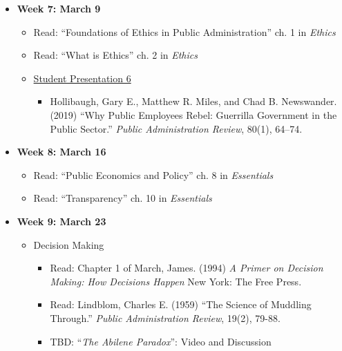 \documentclass[11pt]{article}
\begin{document}
\begin{itemize}
	\item[] \textbf{Week 7: March 9} 
		\begin{itemize}
				\item Read: ``Foundations of Ethics in Public Administration'' ch. 1 in \emph{Ethics}
				\item Read: ``What is Ethics'' ch. 2 in \emph{Ethics}
				\item \underline{Student Presentation 6}
					\begin{itemize}
						\item Hollibaugh, Gary E., Matthew R. Miles, and Chad B. Newswander. (2019) ``Why Public Employees Rebel: Guerrilla Government in the Public Sector.'' \emph{Public Administration Review}, 80(1), 64--74.
					\end{itemize}
		\end{itemize}

	
	\item[] \textbf{Week 8:  March 16} 
	\begin{itemize}
		\item Read: ``Public Economics and Policy'' ch. 8 in \emph{Essentials}
		\item Read: ``Transparency'' ch. 10 in \emph{Essentials}
	\end{itemize}
	
	\item[] \textbf{Week 9: March 23} 
	\begin{itemize}
		\item Decision Making
			\begin{itemize}
				\item Read: Chapter 1 of March, James. (1994) \textit{A Primer on Decision Making: How Decisions Happen} New York: The Free Press.
				\item Read: Lindblom, Charles E. (1959) ``The Science of Muddling Through.'' \textit{Public Administration Review}, 19(2), 79-88.  
				\item TBD: ``\textit{The Abilene Paradox}'': Video and Discussion
			\end{itemize}
	\end{itemize}
	

\end{itemize}
\end{document}
